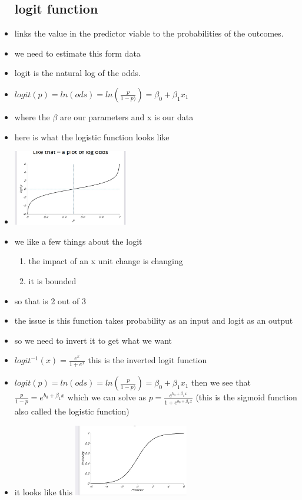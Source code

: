 \documentclass{article}
\begin{document}
\begin{itemize}
\subsection{logit function }
\item links the value in the predictor viable to the probabilities of the outcomes.
\item we need to estimate this form data 
\item logit is the natural log of the odds.
\item $logit(p)=ln(ods)=ln(\frac{p}{1-p)})=\beta_0+\beta_1 x_1$
\item where the $\beta$ are our parameters and x is our data 
\item here is what the logistic function looks like
\item \includegraphics[width=5cm]{Final_Review/lecture_10/logit.jpg}
\item we like a few things about the logit 
\begin{enumerate}
    \item the impact of an x unit change is changing 
    \item it is bounded 
\end{enumerate}
\item so that is 2 out of 3 
\item the issue is this function takes probability as an input and logit as an output
\item so we need to invert it to get what we want 
\item $logit^{-1}(x)=\frac{e^x}{1+e^x}$ this is the inverted logit function 
\item $logit(p)=ln(ods)=ln(\frac{p}{1-p)})=\beta_0+\beta_1 x_1$ then we see that $\frac{p}{1-p}=e^{b_0+\beta_1 x}$ which we can solve as $p=\frac{e^{b_0+\beta_1 x}}{1+e^{b_0+\beta_1 x}}$ (this is the sigmoid function also called the logistic function)
\item it looks like this 
\includegraphics[width=5cm]{Final_Review/lecture_10/sigmoid.jpg}

\end{itemize}
\end{document}
